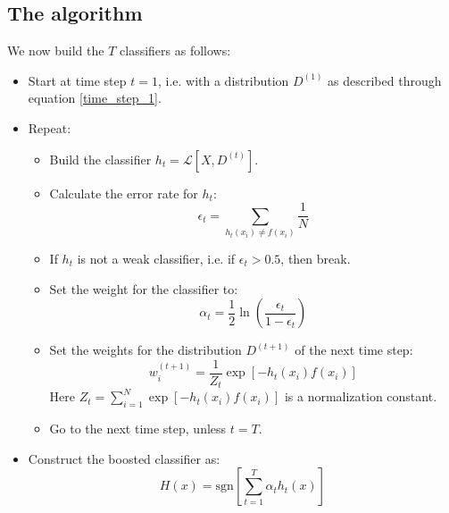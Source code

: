 \documentclass[12pt, a4paper]{article}
\numberwithin{equation}{section}
\begin{document}
\subsection{The algorithm}
We now build the $T$ classifiers as follows:
\begin{itemize}
\item Start at time step $t=1$, i.e. with a distribution $D^{(1)}$ as described through equation \ref{time_step_1}.
\item Repeat:
\begin{itemize}
\item Build the classifier $h_t=\mathcal{L}[X,D^{(t)}]$.
\item Calculate the error rate for $h_t$:
\begin{equation}
\epsilon_t=\sum_{h_t(x_i)\neq f(x_i)}\frac{1}{N} 
\end{equation}
\item If $h_t$ is not a weak classifier, i.e. if $\epsilon_t>0.5$, then break.
\item Set the weight for the classifier to:
\begin{equation}
\alpha_t=\frac{1}{2}\ln\left(\frac{\epsilon_t}{1-\epsilon_t}\right)
\end{equation}
\item Set the weights for the distribution $D^{(t+1)}$ of the next time step:
\begin{equation}
w^{(t+1)}_i=\frac{1}{Z_t}\exp\left[-h_t(x_i)f(x_i)\right]
\end{equation}
Here $Z_t=\sum_{i=1}^N\exp\left[-h_t(x_i)f(x_i)\right]$ is a normalization constant.
\item Go to the next time step, unless $t=T$.
\end{itemize}
\item Construct the boosted classifier as:
\begin{equation}
H(x)=\textrm{sgn}\left[\sum_{t=1}^T \alpha_t h_t(x)\right]
\end{equation}
\end{itemize}
\end{document}
